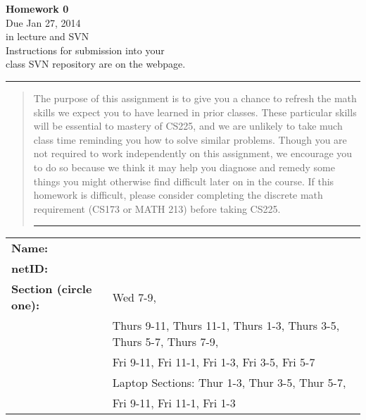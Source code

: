 \documentclass[11pt]{article}
\begin{document}

\begin{center}
\LARGE
\textbf{Homework 0}
\\[1ex]
\Large Due Jan 27, 2014 \\ in lecture and SVN \\ \large Instructions for submission into your \\ class SVN repository are on the webpage.
\end{center}

\bigskip\hrule
\begin{quote}
The purpose of this assignment is to give you  a chance to refresh the math
skills we expect you to have learned in prior classes.  These particular skills
will be essential to  mastery of CS225, and we are unlikely to take much class
time reminding you how to solve similar problems.  Though you are not required
to work independently on this assignment, we encourage you to do so because we
think it may help you diagnose and  remedy some things you might otherwise find
difficult later on in the course. If this homework is difficult, please consider
completing the discrete math requirement (CS173 or MATH 213) before taking CS225. 

\bigskip
\hrule %

\end{quote}

\begin{table}[h]
\centering
\renewcommand{\arraystretch}{1.5}
\begin{tabular}{l l }
\bfseries{Name:} & \\
\bfseries{netID:} & \\
\bfseries{Section} (circle one): & Wed 7-9, \\
 & Thurs 9-11, Thurs 11-1,	Thurs 1-3, Thurs 3-5, Thurs 5-7, Thurs 7-9, \\
 & \hspace{.2in} Fri 9-11, Fri 11-1, Fri 1-3, Fri 3-5, Fri 5-7\\
 & Laptop Sections: Thur 1-3, Thur 3-5, Thur 5-7, \\
 & \hspace{.2in} Fri 9-11, Fri 11-1, Fri 1-3 \\
\end{tabular}
\end{table}
\end{document}
